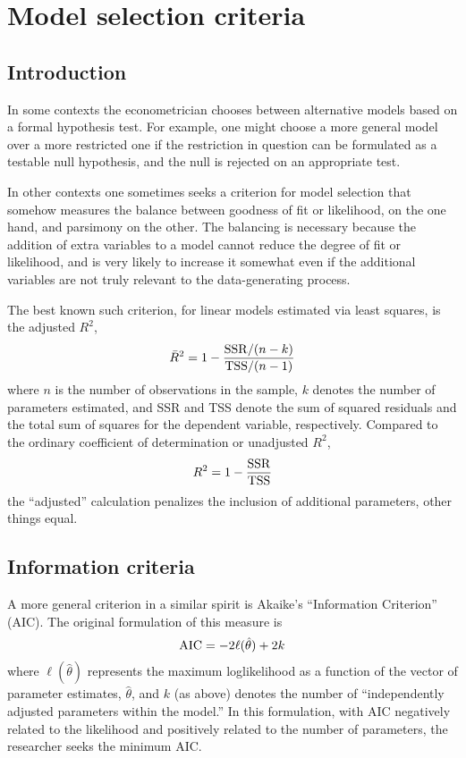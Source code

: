 \chapter{Model selection criteria}
\label{select-criteria}

\section{Introduction}
\label{select-intro}

In some contexts the econometrician chooses between alternative models
based on a formal hypothesis test.  For example, one might choose a
more general model over a more restricted one if the restriction in
question can be formulated as a testable null hypothesis, and the null
is rejected on an appropriate test.

In other contexts one sometimes seeks a criterion for model selection
that somehow measures the balance between goodness of fit or
likelihood, on the one hand, and parsimony on the other.  The
balancing is necessary because the addition of extra variables to a
model cannot reduce the degree of fit or likelihood, and is very
likely to increase it somewhat even if the additional variables are
not truly relevant to the data-generating process.

The best known such criterion, for linear models estimated via least
squares, is the adjusted $R^2$,
%
\[
\bar{R}^2 = 1 - \frac{{\rm SSR} / (n-k)}{{\rm TSS} / (n-1)}
\]
%
where $n$ is the number of observations in the sample, $k$ denotes the
number of parameters estimated, and SSR and TSS denote the sum of
squared residuals and the total sum of squares for the dependent
variable, respectively.  Compared to the ordinary coefficient of
determination or unadjusted $R^2$,
%
\[
R^2 = 1 - \frac{{\rm SSR}}{{\rm TSS}}
\]
%
the ``adjusted'' calculation penalizes the inclusion of additional
parameters, other things equal.  

\section{Information criteria}
\label{select-aic}

A more general criterion in a similar spirit is Akaike's
\citeyearpar{akaike74} ``Information Criterion'' (AIC).  The original
formulation of this measure is
%
\begin{equation}
\label{aic-orig}
{\rm AIC} = -2 \ell(\hat{\theta}) + 2k
\end{equation}
%
where $\ell(\hat{\theta})$ represents the maximum loglikelihood as a
function of the vector of parameter estimates, $\hat{\theta}$, and $k$
(as above) denotes the number of ``independently adjusted parameters
within the model.''  In this formulation, with AIC negatively related
to the likelihood and positively related to the number of parameters,
the researcher seeks the minimum AIC.

